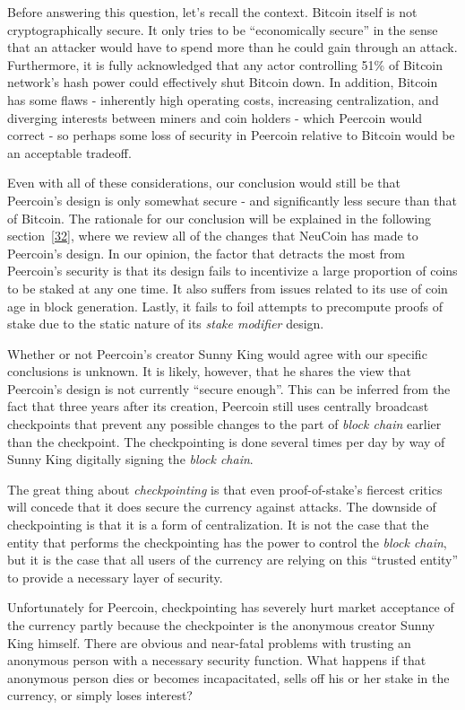 \documentclass[a4paper,11pt]{article}
\begin{document}
Before answering this question, let's recall the context. Bitcoin itself is not cryptographically secure\cite{Fischer}. It only tries to be ``economically secure'' in the sense that an attacker would have to spend more than he could gain through an attack. Furthermore, it is fully acknowledged that any actor controlling 51\% of Bitcoin network's hash power could effectively shut Bitcoin down. In addition, Bitcoin has some flaws - inherently high operating costs, increasing centralization, and diverging interests between miners and coin holders - which Peercoin would correct - so perhaps some loss of security in Peercoin relative to Bitcoin would be an acceptable tradeoff. 

Even with all of these considerations, our conclusion would still be that Peercoin's design is only somewhat secure - and significantly less secure than that of Bitcoin. The rationale for our conclusion will be explained in the following section~\ref{32}, where we review all of the changes that NeuCoin has made to Peercoin's design. In our opinion, the factor that detracts the most from Peercoin's security is that its design fails to incentivize a large proportion of coins to be staked at any one time. It also suffers from issues related to its use of coin age in block generation. Lastly, it fails to foil attempts to precompute proofs of stake due to the static nature of its \textit{stake modifier} design. 

Whether or not Peercoin's creator Sunny King would agree with our specific conclusions is unknown. It is likely, however, that he shares the view that Peercoin's design is not currently ``secure enough''. This can be inferred from the fact that three years after its creation, Peercoin still uses centrally broadcast checkpoints that prevent any possible changes to the part of \textit{block chain} earlier than the checkpoint. The checkpointing is done several times per day by way of Sunny King digitally signing the \textit{block chain}.

The great thing about \textit{checkpointing} is that even proof-of-stake's fiercest critics will concede that it does secure the currency against attacks. The downside of checkpointing is that it is a form of centralization. It is not the case that the entity that performs the checkpointing has the power to control the \textit{block chain}, but it is the case that all users of the currency are relying on this ``trusted entity'' to provide a necessary layer of security. 

Unfortunately for Peercoin, checkpointing has severely hurt market acceptance of the currency partly because the checkpointer is the anonymous creator Sunny King himself. There are obvious and near-fatal problems with trusting an anonymous person with a necessary security function. What happens if that anonymous person dies or becomes incapacitated, sells off his or her stake in the currency, or simply loses interest? 
\end{document}

